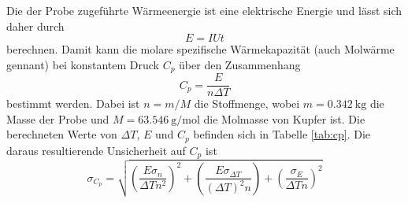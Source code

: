 Die der Probe zugeführte Wärmeenergie ist eine elektrische Energie und lässt sich daher durch
\begin{equation*}
  E=IUt
\end{equation*}
berechnen. Damit kann die molare spezifische Wärmekapazität (auch Molwärme gennant) bei konstantem Druck $C_p$ über den Zusammenhang
\begin{equation*}
  C_p=\frac{E}{n \Delta T}
\end{equation*}
bestimmt werden. Dabei ist $n=m/M$ die Stoffmenge, wobei $m = \SI{0.342}{\kilo\gram}$ die
Masse der Probe und $M = \SI{63.546}{\gram\per\mole}$ \cite{Molmasse} die Molmasse von Kupfer ist.
Die berechneten Werte von $\Delta T$, $E$ und $C_p$ befinden sich in Tabelle \ref{tab:cp}.
Die daraus resultierende Unsicherheit auf $C_p$ ist
\begin{equation*}
  \sigma_{C_p} =
  \sqrt{
  \left(\frac{E \sigma_n}{\Delta T n^{2}}\right)^2
  + \left(\frac{E \sigma_{\Delta T}}{(\Delta T)^2 n}\right) + \left(\frac{\sigma_E}{\Delta T n}\right)^2
  }
\end{equation*}

